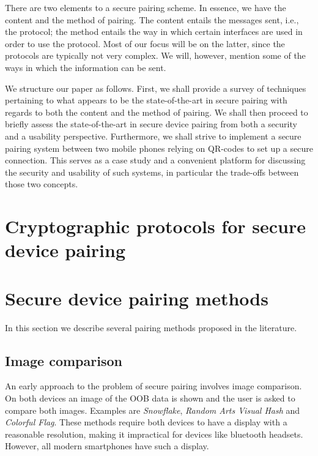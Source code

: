\documentclass[conference, 11pt]{sty/IEEEtran}
\begin{document}
There are two elements to a secure pairing scheme.
In essence, we have the content and the method of pairing.
The content entails the messages sent, i.e., the protocol; the method entails the way in which certain interfaces are used in order to use the protocol.
Most of our focus will be on the latter, since the protocols are typically not very complex.
We will, however, mention some of the ways in which the information can be sent.

We structure our paper as follows.
First, we shall provide a survey of techniques pertaining to what appears to be the state-of-the-art in secure pairing with regards to both the content and the method of pairing.
We shall then proceed to briefly assess the state-of-the-art in secure device pairing from both a security and a usability perspective.
Furthermore, we shall strive to implement a secure pairing system between two mobile phones relying on QR-codes to set up a secure connection.
This serves as a case study and a convenient platform for discussing the security and usability of such systems, in particular the trade-offs between those two concepts.

\section{Cryptographic protocols for secure device pairing}
\label{sec:cryptographic_protocols_for_secure_device_pairing}

\section{Secure device pairing methods}
\label{sec:secure_device_pairing_methods}

In this section we describe several pairing methods proposed in the literature.

\subsection{Image comparison}
An early approach to the problem of secure pairing involves image comparison.
On both devices an image of the OOB data is shown and the user is asked to compare both images.
Examples are \textit{Snowflake}\cite{goldberg1996visual}, \textit{Random Arts Visual Hash}\cite{perrig1999hash} and \textit{Colorful Flag}\cite{dohrmann2002public}.
These methods require both devices to have a display with a reasonable resolution, making it impractical for devices like bluetooth headsets. However, all modern smartphones have such a display.
\end{document}
